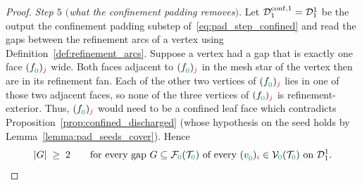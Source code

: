 \documentclass[a4paper, 12pt]{article}
\makeatletter
\newcommand{\green}{\color{ForestGreen}}
\newcommand{\brickred}{\color{BrickRed}}
\newcommand{\T}{\mathcal{T}}
\newcommand{\V}{\mathcal{V}}
\newcommand{\F}{\mathcal{F}}
\newcommand{\vertex}[2]{\freeQ{v}{}{#1}{#2}}
\newcommand{\face}[2]{\freeQ{f}{}{#1}{#2}}
\newcommand{\coarseIdxone}{{\brickred i}}
\newcommand{\fineIdxone}{{\brickred j}}
\newcommand{\lzero}{{\green 0}}
\newcommand{\freeQ}[4]{ ( {#1}^{#2}_{#3} )_{#4}}
\theoremstyle{definition}
\theoremstyle{plain}
\numberwithin{equation}{section}
\DeclareRobustCommand{\domseq}[1][]{\mathcal{D}\ifx\@empty#1\@empty\else_{#1}\fi}
\makeatother
\begin{document}
\begin{proof}
    \emph{Step $5$ $($what the confinement padding removes$)$.} Let $\domseq[1]^{\mathrm{conf},1} = \domseq[1]^{1}$ be the output the confinement padding substep of~\eqref{eq:pad_step_confined} and read the gaps between the refinement arcs of a vertex using Definition~\ref{def:refinement_arcs}. Suppose a vertex had a gap that is exactly one face $\face{\lzero}{\fineIdxone}$ wide. Both faces adjacent to $\face{\lzero}{\fineIdxone}$ in the mesh star of the vertex then are in its refinement fan. Each of the other two vertices of $\face{\lzero}{\fineIdxone}$ lies in one of those two adjacent faces, so none of the three vertices of $\face{\lzero}{\fineIdxone}$ is refinement-exterior. Thus, $\face{\lzero}{\fineIdxone}$ would need to be a confined leaf face which contradicts Proposition~\ref{prop:confined_discharged} (whose hypothesis on the seed holds by Lemma~\ref{lemma:pad_seeds_cover}). Hence
    \begin{equation}
        \label{eq:stars_only_gaps}
        \vert G \vert \; \geq \; 2
        \qquad \text{for every gap } G \subseteq \F_\lzero(\T_\lzero) \text{ of every } \vertex{\lzero}{\coarseIdxone} \in \V_\lzero(\T_\lzero) \text{ on } \domseq[1]^{1} .
    \end{equation}


\end{proof}
\end{document}

